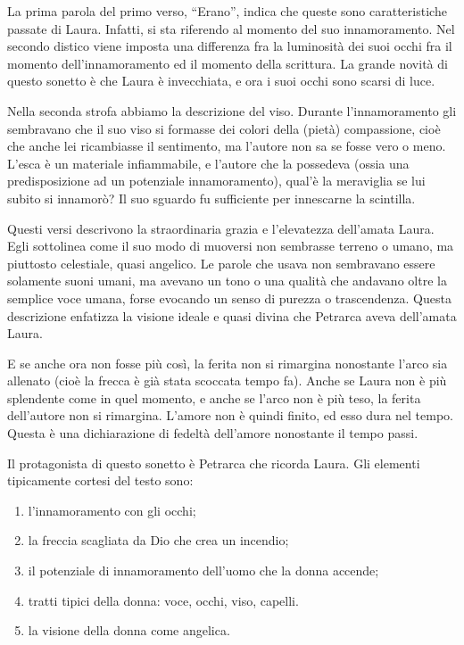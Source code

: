 \documentclass[a4paper]{article}
\newcommand*\circled[1]{\tikz[baseline=(char.base)]{
            \node[shape=circle,draw,inner sep=2pt] (char) {#1};}}
\newcommand{\quotes}[1]{``#1''}
\begin{document}
La prima parola del primo verso, \quotes{Erano}, indica che queste sono caratteristiche
passate di Laura. Infatti, si sta riferendo al momento del suo innamoramento.
Nel secondo distico viene imposta una differenza fra la luminosità dei suoi occhi
fra il momento dell'innamoramento ed il momento della scrittura.
La grande novità di questo sonetto è che Laura è invecchiata, e ora i suoi occhi sono scarsi di luce.


\circled{2} Nella seconda strofa abbiamo la descrizione del viso.
Durante l'innamoramento gli sembravano che il suo viso si formasse dei colori della (pietà) compassione,
cioè che anche lei ricambiasse il sentimento, ma l'autore non sa se fosse vero o meno.
L'esca è un materiale infiammabile, e l'autore che la possedeva (ossia una predisposizione ad un potenziale innamoramento),
qual'è la meraviglia se lui subito si innamorò? Il suo sguardo fu sufficiente per innescarne la scintilla.

\pagebreak

\circled{3} Questi versi descrivono la straordinaria grazia e l'elevatezza dell'amata Laura.
Egli sottolinea come il suo modo di muoversi non sembrasse terreno o umano, ma piuttosto celestiale,
quasi angelico. Le parole che usava non sembravano essere solamente suoni umani,
ma avevano un tono o una qualità che andavano oltre la semplice voce umana, forse evocando
un senso di purezza o trascendenza.
Questa descrizione enfatizza la visione ideale e quasi divina che Petrarca aveva dell'amata Laura.

\circled{4} E se anche ora non fosse più così, la ferita non si rimargina nonostante l'arco sia allenato (cioè la frecca è già stata scoccata tempo fa).
Anche se Laura non è più splendente come in quel momento, e anche se l'arco non è più teso, la ferita dell'autore non si rimargina.
L'amore non è quindi finito, ed esso dura nel tempo. Questa è una dichiarazione di fedeltà dell'amore nonostante il tempo passi.

Il protagonista di questo sonetto è Petrarca che ricorda Laura.
Gli elementi tipicamente cortesi del testo sono:
\begin{enumerate}
    \item l'innamoramento con gli occhi;
    \item la freccia scagliata da Dio che crea un incendio;
    \item il potenziale di innamoramento dell'uomo che la donna accende;
    \item tratti tipici della donna: voce, occhi, viso, capelli.
    \item la visione della donna come angelica.
\end{enumerate}
\end{document}

